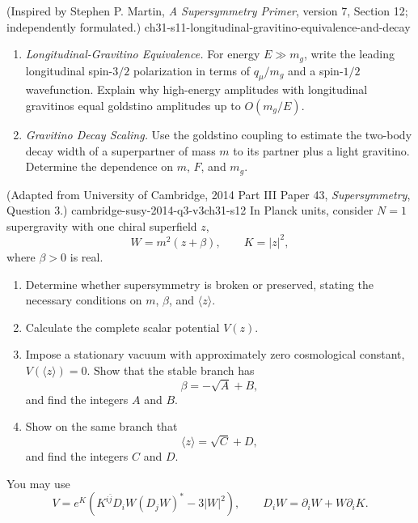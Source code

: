 \begin{enumerate}
    {(Inspired by Stephen P. Martin, \emph{A Supersymmetry Primer}, version 7, Section 12; independently formulated.)}
    {ch31-s11-longitudinal-gravitino-equivalence-and-decay}
  \begin{enumerate}
    \item \emph{Longitudinal-Gravitino Equivalence.}
    For energy \(E\gg m_g\), write the leading longitudinal
      spin-\(3/2\) polarization in terms of \(q_\mu/m_g\) and a spin-\(1/2\)
      wavefunction.  Explain why high-energy amplitudes with longitudinal
      gravitinos equal goldstino amplitudes up to \(O(m_g/E)\).
    \item \emph{Gravitino Decay Scaling.}
    Use the goldstino coupling to estimate the two-body decay width of a
      superpartner of mass \(m\) to its partner plus a light gravitino.
      Determine the dependence on \(m\), \(F\), and \(m_g\).
  \end{enumerate}

    {(Adapted from University of Cambridge, 2014 Part III Paper 43,
      \emph{Supersymmetry}, Question 3.)}
    {cambridge-susy-2014-q3-v3ch31-s12}
  In Planck units, consider \(N=1\) supergravity with one chiral
  superfield \(z\),
  \[
    W=m^2(z+\beta),
    \qquad
    K=|z|^2,
  \]
  where \(\beta>0\) is real.
  \begin{enumerate}
    \item Determine whether supersymmetry is broken or preserved, stating
      the necessary conditions on \(m\), \(\beta\), and \(\langle z\rangle\).
    \item Calculate the complete scalar potential \(V(z)\).
    \item Impose a stationary vacuum with approximately zero cosmological
      constant, \(V(\langle z\rangle)=0\).  Show that the stable branch has
      \[
        \beta=-\sqrt A+B,
      \]
      and find the integers \(A\) and \(B\).
    \item Show on the same branch that
      \[
        \langle z\rangle=\sqrt C+D,
      \]
      and find the integers \(C\) and \(D\).
  \end{enumerate}
  You may use
  \[
    V=e^K\left(K^{i\bar j}D_iW(D_jW)^*-3|W|^2\right),
    \qquad
    D_iW=\partial_iW+W\partial_iK.
  \]

\end{enumerate}
